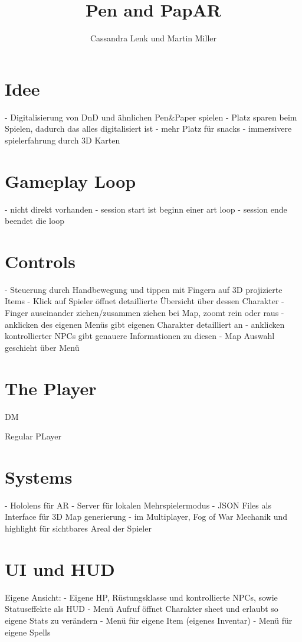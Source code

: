 \documentclass[11pt]{article}
\begin{document}
    \title{Pen and PapAR}
    \author{Cassandra Lenk und Martin Miller}

    \maketitle
    \newpage

    \tableofcontents
    \newpage

    \section{Idee}
    - Digitalisierung von DnD und ähnlichen Pen&Paper spielen
    - Platz sparen beim Spielen, dadurch das alles digitalisiert ist
    - mehr Platz für snacks
    - immersivere spielerfahrung durch 3D Karten

    \section{Gameplay Loop}
    - nicht direkt vorhanden
    - session start ist beginn einer art loop
    - session ende beendet die loop

    \section{Controls}
    - Steuerung durch Handbewegung und tippen mit Fingern auf 3D projizierte Items
    - Klick auf Spieler öffnet detaillierte Übersicht über dessen Charakter
    - Finger auseinander ziehen/zusammen ziehen bei Map, zoomt rein oder raus
    - anklicken des eigenen Menüs gibt eigenen Charakter detailliert an
    - anklicken kontrollierter NPCs gibt genauere Informationen zu diesen
    - Map Auswahl geschieht über Menü

    \section{The Player}
    DM


    Regular PLayer


    \section{Systems}
    - Hololens für AR
    - Server für lokalen Mehrspielermodus
    - JSON Files als Interface für 3D Map generierung
    - im Multiplayer, Fog of War Mechanik und highlight für sichtbares Areal der Spieler

    \section{UI und HUD}
    Eigene Ansicht:
    - Eigene HP, Rüstungsklasse und kontrollierte NPCs, sowie Statuseffekte als HUD
    - Menü Aufruf öffnet Charakter sheet und erlaubt so eigene Stats zu verändern
    - Menü für eigene Item (eigenes Inventar)
    - Menü für eigene Spells
\end{document}

